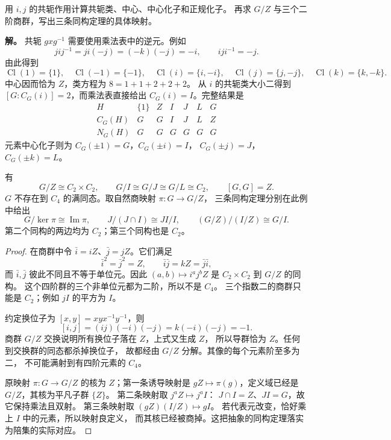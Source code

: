 \begin{exbox}[商掉中心以后还剩下什么]
用 $i,j$ 的共轭作用计算共轭类、中心、中心化子和正规化子。
再求 $G/Z$ 与三个二阶商群，写出三条同构定理的具体映射。
\end{exbox}

\textbf{解。} 共轭 $gxg^{-1}$ 需要使用乘法表中的逆元。例如
\[
jij^{-1}=ji(-j)=(-k)(-j)=-i,
\qquad iji^{-1}=-j.
\]
由此得到
\[
\operatorname{Cl}(1)=\{1\},\quad
\operatorname{Cl}(-1)=\{-1\},\quad
\operatorname{Cl}(i)=\{i,-i\},\quad
\operatorname{Cl}(j)=\{j,-j\},\quad
\operatorname{Cl}(k)=\{k,-k\}.
\]
中心因而恰为 $Z$，类方程为 $8=1+1+2+2+2$。
从 $i$ 的共轭类大小二得到 $[G:C_G(i)]=2$，而乘法表直接给出
$C_G(i)=I$。完整结果是
\[
\begin{array}{c|cccccc}
H&\{1\}&Z&I&J&L&G\\\hline
C_G(H)&G&G&I&J&L&Z\\
N_G(H)&G&G&G&G&G&G
\end{array}
\]
元素中心化子则为 $C_G(\pm1)=G$，$C_G(\pm i)=I$，
$C_G(\pm j)=J$，$C_G(\pm k)=L$。

\begin{proposition}[商群、阿贝尔化与三条同构定理]
\label{prop:q8-quotients-isomorphisms}
有
\[
G/Z\cong C_2\times C_2,
\qquad G/I\cong G/J\cong G/L\cong C_2,
\qquad [G,G]=Z.
\]
$G$ 不存在到 $C_4$ 的满同态。取自然商映射 $\pi:G\to G/Z$，
三条同构定理分别在此例中给出
\[
G/\ker\pi\cong\operatorname{Im}\pi,
\qquad J/(J\cap I)\cong JI/I,
\qquad (G/Z)/(I/Z)\cong G/I.
\]
第二个同构的两边均为 $C_2$；第三个同构也是 $C_2$。
\end{proposition}

\begin{proof}
在商群中令 $\bar i=iZ$、$\bar j=jZ$。它们满足
\[
\bar i^2=\bar j^2=Z,\qquad
\bar i\bar j=kZ=\bar j\bar i,
\]
而 $\bar i,\bar j$ 彼此不同且不等于单位元。因此
$(a,b)\mapsto i^a j^b Z$ 是 $C_2\times C_2$ 到 $G/Z$ 的同构。
这个四阶群的三个非单位元都为二阶，所以不是 $C_4$。
三个指数二的商群只能是 $C_2$；例如 $jI$ 的平方为 $I$。

约定换位子为 $[x,y]=xyx^{-1}y^{-1}$，则
\[
[i,j]=(ij)(-i)(-j)=k(-i)(-j)=-1.
\]
商群 $G/Z$ 交换说明所有换位子落在 $Z$，上式又生成 $Z$，
所以导群恰为 $Z$。任何到交换群的同态都杀掉换位子，
故都经由 $G/Z$ 分解。其像的每个元素阶至多为二，
不可能满射到有四阶元素的 $C_4$。

原映射 $\pi:G\to G/Z$ 的核为 $Z$；第一条诱导映射是
$gZ\mapsto\pi(g)$，定义域已经是 $G/Z$，其核为平凡子群 $\{Z\}$。
第二条映射取 $j^aZ\mapsto j^a I$：
$J\cap I=Z$、$JI=G$，故它保持乘法且双射。
第三条映射取 $(gZ)(I/Z)\mapsto gI$。
若代表元改变，恰好乘上 $I$ 中的元素，所以映射良定义，
而其核已经被商掉。这把抽象的同构定理落实为陪集的实际对应。
\end{proof}

